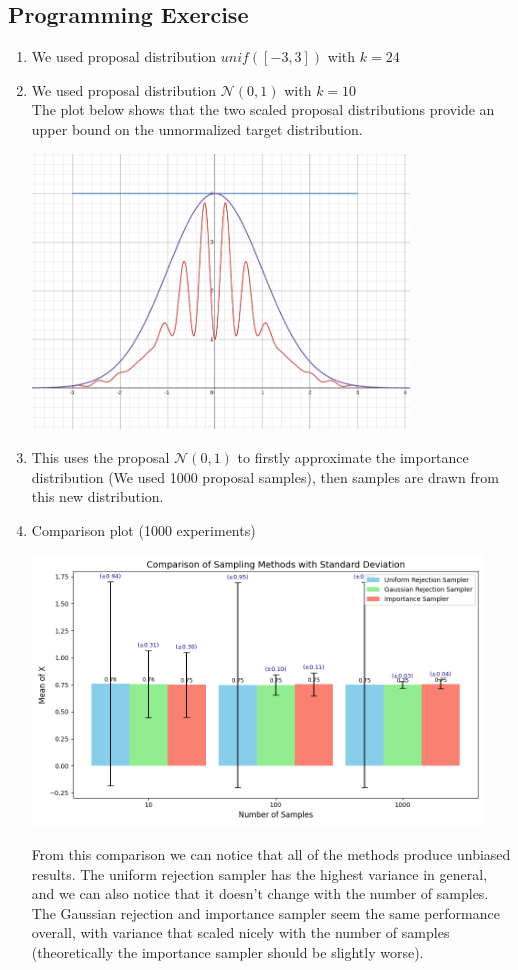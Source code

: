 \subsection{Programming Exercise}
\begin{enumerate}
  \item We used proposal distribution $unif([-3,3])$ with $k=24$
  \item We used proposal distribution $\mathcal{N}(0,1) $ with $k=10$ \\
   The plot below shows that the two scaled proposal distributions provide an upper bound on the unnormalized target distribution.
  \begin{center}
      \includegraphics[width=10cm]{./figures/proposals.png}
  \end{center}
  \item This uses the proposal $\mathcal{N}(0,1)$ to firstly approximate the importance distribution (We used 1000 proposal samples), then samples are drawn from this new distribution.
  \item Comparison plot (1000 experiments)
  \begin{center}
      \includegraphics[width=12cm]{./figures/comparison1.png}
  \end{center}
  From this comparison we can notice that all of the methods produce unbiased results.
  The uniform rejection sampler has the highest variance in general, 
  and we can also notice that it doesn't change with the number of samples.
  The Gaussian rejection and importance sampler seem the same performance overall,
  with variance that scaled nicely with the number of samples
  (theoretically the importance sampler should be slightly worse).
\end{enumerate}


